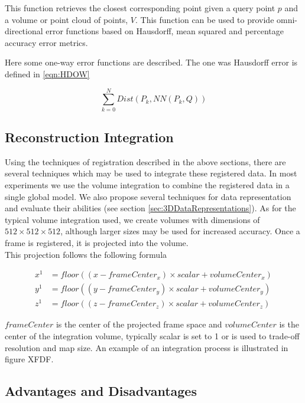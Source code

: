 This function retrieves the closest corresponding point given a query point $p$ and a volume or point cloud of points, $V$. This function can be used to provide omni-directional error functions based on Hausdorff, mean squared and percentage accuracy error metrics.

Here some one-way error functions are described. The one was Hausdorff error is defined in \ref{eqn:HDOW} 

\begin{equation} \label{eqn:HDOW}
\sum_{k=0}^{N} Dist(P_k, NN(P_k, Q))
\end{equation}

\subsection{Reconstruction Integration}

Using the techniques of registration described in the above sections, there are several techniques which may be used to integrate these registered data. In most experiments we use the volume integration to combine the registered data in a single global model. We also propose several techniques for data representation and evaluate their abilities (see section \ref{sec:3DDataRepresentations}). As for the typical volume integration used, we create volumes with dimensions of $512\times 512\times 512$, although larger sizes may be used for increased accuracy. Once a frame is registered, it is projected into the volume. \\

This projection follows the following formula


\begin{equation} \label{eqn:volIntegration}
\begin{split}
x^{1} & = floor((x - frameCenter_x) \times scalar + volumeCenter_x) \\
y^{1} & = floor((y - frameCenter_y) \times scalar + volumeCenter_y) \\
z^{1} & = floor((z - frameCenter_z) \times scalar + volumeCenter_z)
\end{split}
\end{equation}

$frameCenter$ is the center of the projected frame space and $volumeCenter$ is the center of the integration volume, typically scalar is set to 1 or is used to trade-off resolution and map size. An example of an integration process is illustrated in figure XFDF. 


\subsection{Advantages and Disadvantages}

